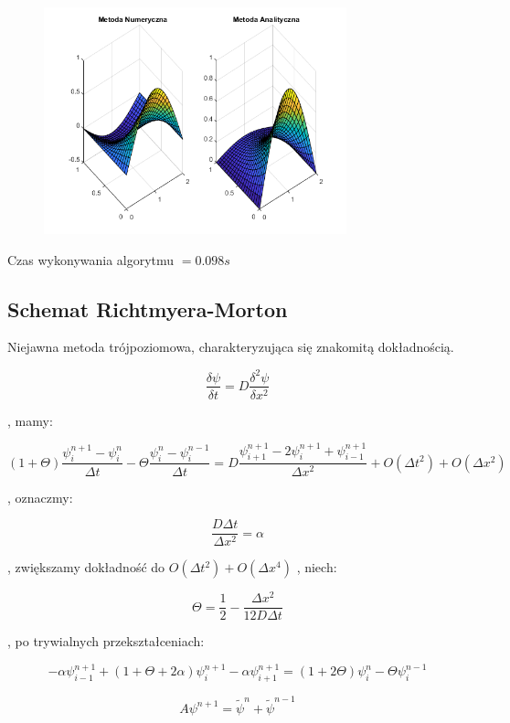 \begin{figure}[!ht]
	\begin{center}
		\includegraphics[width=0.78\textwidth]{Lab7/charts/df/30_2_k.png}
	\end{center}
\end{figure}

Czas wykonywania algorytmu $ = 0.098 s$

\newpage
\subsection{Schemat Richtmyera-Morton}

Niejawna metoda trójpoziomowa, charakteryzująca się znakomitą dokładnością.

$$\dfrac{\delta \psi}{\delta t} = D\dfrac{\delta^2 \psi}{\delta x^2}$$

, mamy:

$$(1+\Theta)\dfrac{\psi^{n+1}_{i}-\psi^n_{i}}{\Delta t}-\Theta\dfrac{\psi^{n}_{i}-\psi^{n-1}_{i}}{\Delta t} = D \dfrac{\psi^{n+1}_{i+1}-2\psi^{n+1}_{i}+\psi^{n+1}_{i-1}}{\Delta x^2} + O(\Delta t^2) + O(\Delta x^2) $$

, oznaczmy:

$$\dfrac{D\Delta t}{\Delta x^2} = \alpha$$

, zwiększamy dokładność do  $O(\Delta t^2) + O(\Delta x^4)$ , niech:

$$\Theta = \frac{1}{2} - \dfrac{\Delta x^2}{12D\Delta t}$$

, po trywialnych przekształceniach:

$$-\alpha\psi^{n+1}_{i-1}+(1+\Theta + 2\alpha)\psi^{n+1}_{i}-\alpha\psi^{n+1}_{i+1}=(1+2\Theta)\psi^{n}_{i} - \Theta\psi^{n-1}_{i}$$

$$A\psi^{n+1}=\widetilde{\psi}^{n}+\widetilde{\psi}^{n-1}$$

